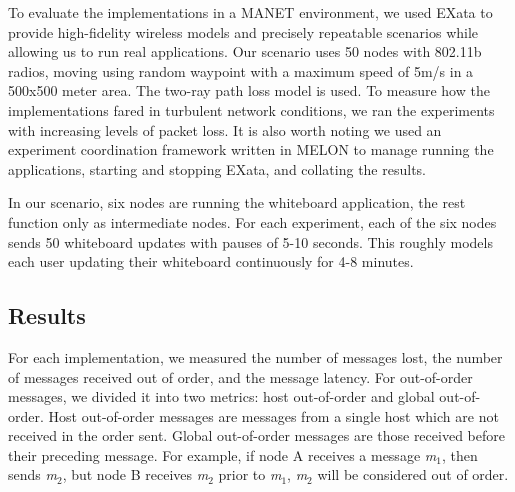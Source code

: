\documentclass{llncs}
\begin{document}
To evaluate the implementations in a MANET environment, we used EXata\cite{exata} to provide high-fidelity wireless models and precisely repeatable scenarios while allowing us to run real applications. Our scenario uses 50 nodes with 802.11b radios, moving using random waypoint with a maximum speed of 5m/s in a 500x500 meter area. The two-ray path loss model is used. To measure how the implementations fared in turbulent network conditions, we ran the experiments with increasing levels of packet loss. It is also worth noting we used an experiment coordination framework written in MELON to manage running the applications, starting and stopping EXata, and collating the results.

In our scenario, six nodes are running the whiteboard application, the rest function only as intermediate nodes. For each experiment, each of the six nodes sends 50 whiteboard updates with pauses of 5-10 seconds. This roughly models each user updating their whiteboard continuously for 4-8 minutes.

\subsection{Results}

For each implementation, we measured the number of messages lost, the number of messages received out of order, and the message latency. For out-of-order messages, we divided it into two metrics: host out-of-order and global out-of-order. Host out-of-order messages are messages from a single host which are not received in the order sent. Global out-of-order messages are those received before their preceding message. For example, if node A receives a message \textit{m}$_{1}$, then sends \textit{m}$_{2}$, but node B receives \textit{m}$_{2}$ prior to \textit{m}$_{1}$, \textit{m}$_{2}$ will be considered out of order.
\end{document}
